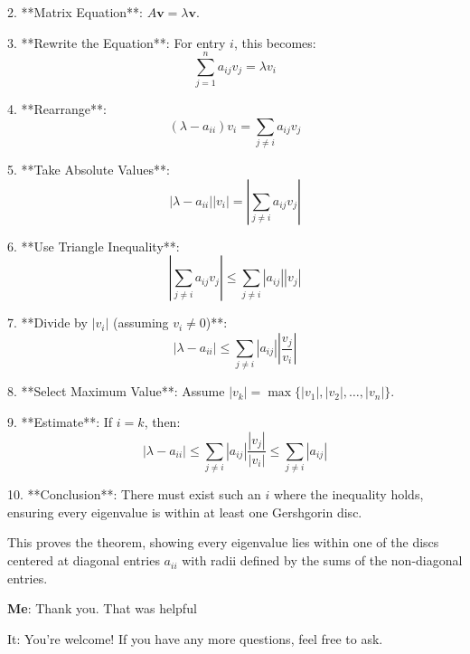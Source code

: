 \documentclass{article}
\begin{document}
2. **Matrix Equation**:
   \( A\mathbf{v} = \lambda\mathbf{v} \).

3. **Rewrite the Equation**:
   For entry \( i \), this becomes:
   \[
   \sum_{j=1}^n a_{ij} v_j = \lambda v_i
   \]

4. **Rearrange**:
   \[
   (\lambda - a_{ii})v_i = \sum_{j \neq i} a_{ij} v_j
   \]

5. **Take Absolute Values**:
   \[
   |\lambda - a_{ii}||v_i| = \left|\sum_{j \neq i} a_{ij} v_j\right|
   \]

6. **Use Triangle Inequality**:
   \[
   \left|\sum_{j \neq i} a_{ij} v_j\right| \leq \sum_{j \neq i} |a_{ij}||v_j|
   \]

7. **Divide by \(|v_i|\) (assuming \(v_i \neq 0\))**:
   \[
   |\lambda - a_{ii}| \leq \sum_{j \neq i} |a_{ij}|\left|\frac{v_j}{v_i}\right|
   \]

8. **Select Maximum Value**:
   Assume \(|v_k| = \max \{|v_1|, |v_2|, \ldots, |v_n|\}\).

9. **Estimate**:
   If \(i = k\), then:
   \[
   |\lambda - a_{ii}| \leq \sum_{j \neq i} |a_{ij}|\frac{|v_j|}{|v_i|} \leq \sum_{j \neq i} |a_{ij}|
   \]

10. **Conclusion**:
    There must exist such an \( i \) where the inequality holds, ensuring every eigenvalue is within at least one Gershgorin disc.

This proves the theorem, showing every eigenvalue lies within one of
the discs centered at diagonal entries \( a_{ii} \) with radii defined
by the sums of the non-diagonal entries.

{\bf Me}: Thank you. That was helpful

It: You're welcome! If you have any more questions, feel free to ask.
\end{document}
